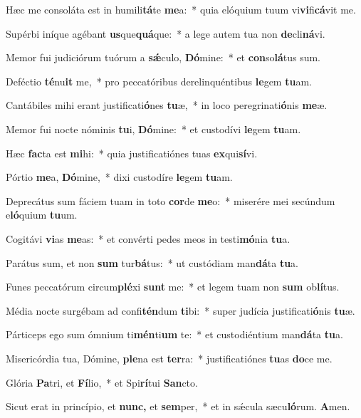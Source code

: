 \item Hæc me consoláta est in humili\textbf{tá}te \textbf{me}a:~* quia elóquium tuum vi\textbf{vi}fi\textbf{cá}vit me.
\item Supérbi iníque agébant \textbf{us}que\textbf{quá}que:~* a lege autem tua non \textbf{de}cli\textbf{ná}vi.
\item Memor fui judiciórum tuórum a \textbf{sǽ}culo, \textbf{Dó}mine:~* et \textbf{con}so\textbf{lá}tus sum.
\item Deféctio \textbf{té}nu\textbf{it} me,~* pro peccatóribus derelinquéntibus \textbf{le}gem \textbf{tu}am.
\item Cantábiles mihi erant justificati\textbf{ó}nes \textbf{tu}æ,~* in loco peregrinati\textbf{ó}nis \textbf{me}æ.
\item Memor fui nocte nóminis \textbf{tu}i, \textbf{Dó}mine:~* et custodívi \textbf{le}gem \textbf{tu}am.
\item Hæc \textbf{fac}ta est \textbf{mi}hi:~* quia justificatiónes tuas \textbf{ex}qui\textbf{sí}vi.
\item Pórtio \textbf{me}a, \textbf{Dó}mine,~* dixi custodíre \textbf{le}gem \textbf{tu}am.
\item Deprecátus sum fáciem tuam in toto \textbf{cor}de \textbf{me}o:~* miserére mei secúndum e\textbf{ló}quium \textbf{tu}um.
\item Cogitávi \textbf{vi}as \textbf{me}as:~* et convérti pedes meos in testi\textbf{mó}nia \textbf{tu}a.
\item Parátus sum, et non \textbf{sum} tur\textbf{bá}tus:~* ut custódiam man\textbf{dá}ta \textbf{tu}a.
\item Funes peccatórum circum\textbf{plé}xi \textbf{sunt} me:~* et legem tuam non \textbf{sum} ob\textbf{lí}tus.
\item Média nocte surgébam ad confi\textbf{tén}dum \textbf{ti}bi:~* super judícia justificati\textbf{ó}nis \textbf{tu}æ.
\item Párticeps ego sum ómnium ti\textbf{mén}ti\textbf{um} te:~* et custodiéntium man\textbf{dá}ta \textbf{tu}a.
\item Misericórdia tua, Dómine, \textbf{ple}na est \textbf{ter}ra:~* justificatiónes \textbf{tu}as \textbf{do}ce me.
\item Glória \textbf{Pa}tri, et \textbf{Fí}lio,~* et Spi\textbf{rí}tui \textbf{San}cto.
\item Sicut erat in princípio, et \textbf{nunc,} et \textbf{sem}per,~* et in sǽcula sæcu\textbf{ló}rum. \textbf{A}men.